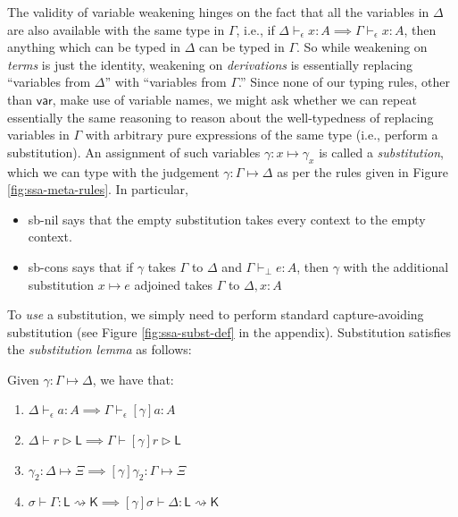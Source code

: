 \documentclass[acmsmall,screen,review]{acmart}
\newcommand{\ms}[1]{\ensuremath{\mathsf{#1}}}
\newcommand{\bhyp}[2]{#1 : #2}
\newcommand{\hasty}[4]{#1 \vdash_{#2} #3: {#4}}
\newcommand{\haslb}[3]{#1 \vdash #2 \rhd #3}
\newcommand{\issubst}[3]{#1: #2 \mapsto #3}
\newcommand{\lbsubst}[4]{#1 \vdash #2: #3 \rightsquigarrow #4}
\newcommand{\brle}[1]{{\textsf{#1}}}
\begin{document}
The validity of variable weakening hinges on the fact that all the variables in $\Delta$ are also
available with the same type in $\Gamma$, i.e., if $\hasty{\Delta}{\epsilon}{x}{A} \implies
\hasty{\Gamma}{\epsilon}{x}{A}$, then anything which can be typed in $\Delta$ can be typed in
$\Gamma$. So while weakening on \emph{terms} is just the identity, weakening on \emph{derivations}
is essentially replacing ``variables from $\Delta$'' with ``variables from $\Gamma$.'' Since none of
our typing rules, other than $\ms{var}$, make use of variable names, we might ask whether we can
repeat essentially the same reasoning to reason about the well-typedness of replacing variables in
$\Gamma$ with arbitrary pure expressions of the same type (i.e., perform a substitution).  
%
An assignment of such variables $\gamma : x \mapsto \gamma_x$ is called a
\emph{substitution}, which we can type with the judgement $\issubst{\gamma}{\Gamma}{\Delta}$ as per
the rules given in Figure \ref{fig:ssa-meta-rules}. In particular,
\begin{itemize}
  \item \brle{sb-nil} says that the empty substitution takes every context to the empty context.
  \item \brle{sb-cons} says that if $\gamma$ takes $\Gamma$ to $\Delta$ and
  $\hasty{\Gamma}{\bot}{e}{A}$, then $\gamma$ with the additional substitution $x \mapsto e$
  adjoined takes $\Gamma$ to $\Delta, \bhyp{x}{A}$
\end{itemize}
To \emph{use} a substitution, we simply need to perform standard capture-avoiding substitution (see
Figure \ref{fig:ssa-subst-def} in the appendix). Substitution satisfies the
\emph{substitution lemma} as follows:
\begin{lemma}[Substitution]
  Given $\issubst{\gamma}{\Gamma}{\Delta}$, we have that:
  \begin{enumerate}[label=(\alph*)]
    \item $\hasty{\Delta}{\epsilon}{a}{A} \implies \hasty{\Gamma}{\epsilon}{[\gamma]a}{A}$ 
    \item $\haslb{\Delta}{r}{\ms{L}} \implies \haslb{\Gamma}{[\gamma]r}{\ms{L}}$
    \item $\issubst{\gamma_2}{\Delta}{\Xi} \implies \issubst{[\gamma]\gamma_2}{\Gamma}{\Xi}$
    \item $\lbsubst{\sigma}{\Gamma}{\ms{L}}{\ms{K}} \implies \lbsubst{[\gamma]\sigma}{\Delta}{\ms{L}}{\ms{K}}$
  \end{enumerate}
\end{lemma}
\end{document}
